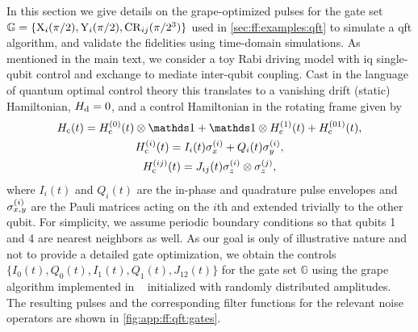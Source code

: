 In this section we give details on the \gls{grape}-optimized pulses for the gate set $\mathbb{G} = \lbrace\mathrm{X}_{i}(\pi/2),\mathrm{Y}_{i}(\pi/2),\mathrm{CR}_{ij}(\pi/2^3)\rbrace$ used in \cref{sec:ff:examples:qft} to simulate a \gls{qft} algorithm, and validate the fidelities using time-domain simulations.
As mentioned in the main text, we consider a toy Rabi driving model with \gls{iq} single-qubit control and exchange to mediate inter-qubit coupling.
Cast in the language of quantum optimal control theory this translates to a vanishing drift (static) Hamiltonian, $H_{\mathrm{d}} =  0$, and a control Hamiltonian in the rotating frame given by
\begin{gather}
    \Hc(t) = \Hc\gth{0}(t)\otimes\eye + \eye\otimes\Hc\gth{1}(t) + \Hc\gth{01}(t), \\
    \Hc\gth{i}(t) = I_i(t)\sx\gth{i} + Q_i(t)\sy\gth{i}, \\
    \Hc\gth{ij}(t) = J_{ij}(t)\sz\gth{i}\otimes\sz\gth{j},
\end{gather}
where $I_i(t)$ and $Q_i(t)$ are the in-phase and quadrature pulse envelopes and $\sigma_{x,y}^{(i)}$ are the Pauli matrices acting on the $i$th and extended trivially to the other qubit.
For simplicity, we assume periodic boundary conditions so that qubits 1 and 4 are nearest neighbors as well.
As our goal is only of illustrative nature and not to provide a detailed gate optimization, we obtain the controls $\lbrace I_0(t), Q_0(t), I_1(t), Q_1(t), J_{12}(t)\rbrace$ for the gate set $\mathbb{G}$ using the \gls{grape} algorithm implemented in \qutip~\cite{Johansson2012} initialized with randomly distributed amplitudes.
The resulting pulses and the corresponding filter functions for the relevant noise operators are shown in \cref{fig:app:ff:qft:gates}.

